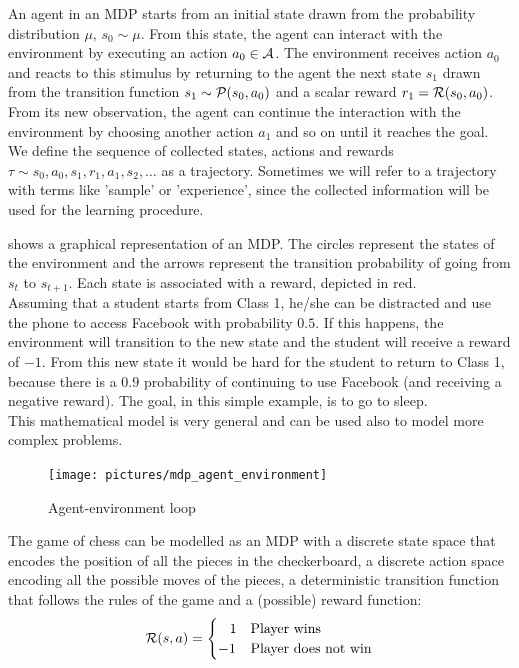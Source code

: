 An agent in an MDP starts from an initial state drawn from the probability distribution $\mu$, $s_0 \sim \mu$. From this state, the agent can interact with the environment by executing an action $a_0 \in \mathcal{A}$. The environment receives action $a_0$ and reacts to this stimulus by returning to the agent the next state $s_1$ drawn from the transition function $s_1 \sim \mathcal{P}(s_0, a_0)$ and a scalar reward $r_1 = \mathcal{R}(s_0, a_0)$. From its new observation, the agent can continue the interaction with the environment by choosing another action $a_1$ and so on until it reaches the goal. We define the  sequence of collected states, actions and rewards $\tau \sim s_0, a_0, s_1, r_1, a_1, s_2, \ldots$ as a trajectory. Sometimes we will refer to a trajectory with terms like 'sample' or 'experience', since the collected information will be used for the learning procedure.

 shows a graphical representation of an MDP. The circles represent the states of the environment and the arrows represent the transition probability of going from $s_t$ to $s_{t+1}$. Each state is associated with a reward, depicted in red. \\
Assuming that a student starts from Class 1, he/she can be distracted and use the phone to access Facebook with probability $0.5$. If this happens, the environment will transition to the new state and the student will receive a reward of $-1$. From this new state it would be hard for the student to return to Class 1, because there is a $0.9$ probability of continuing to use Facebook (and receiving a negative reward). The goal, in this simple example, is to go to sleep.\\
This mathematical model is very general and can be used also to model more complex problems. 

\begin{figure}[t]
\centering
\texttt{[image: pictures/mdp\_agent\_environment]}
\caption{Agent-environment loop}
\end{figure}

\begin{example}[Chess]
The game of chess can be modelled as an MDP with a discrete state space that encodes the position of all the pieces in the checkerboard, a discrete action space encoding all the possible moves of the pieces, a deterministic transition function that follows the rules of the game and a (possible) reward function:
\begin{equation*}
\mathcal{R}(s,a) = \begin{cases}\,\,\,\,\,1 & \textrm{Player wins} \\ -1 & \textrm{Player does not win} \end{cases}
\end{equation*}
\end{example}


